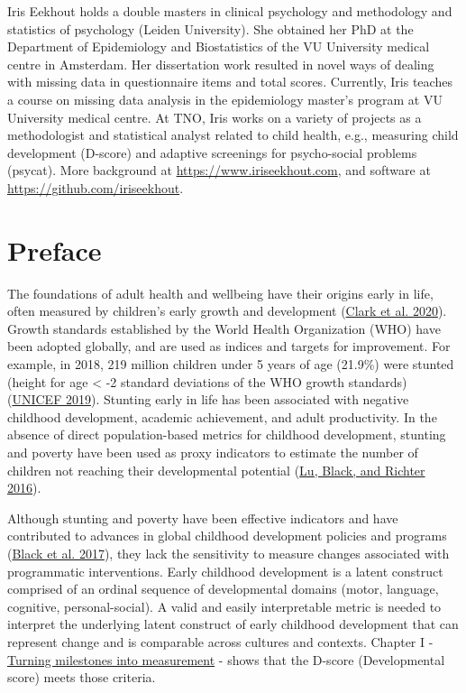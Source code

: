 \documentclass[
]{book}
\begin{document}
Iris Eekhout holds a double masters in clinical psychology and methodology and statistics of psychology (Leiden University). She obtained her PhD at the Department of Epidemiology and Biostatistics of the VU University medical centre in Amsterdam. Her dissertation work resulted in novel ways of dealing with missing data in questionnaire items and total scores. Currently, Iris teaches a course on missing data analysis in the epidemiology master's program at VU University medical centre. At TNO, Iris works on a variety of projects as a methodologist and statistical analyst related to child health, e.g., measuring child development (D-score) and adaptive screenings for psycho-social problems (psycat). More background at \url{https://www.iriseekhout.com}, and software at \url{https://github.com/iriseekhout}.

\hypertarget{preface}{%
\chapter*{Preface}\label{preface}}

The foundations of adult health and wellbeing have their origins early in life, often measured by children's early growth and development (\protect\hyperlink{ref-clark2020}{Clark et al. 2020}). Growth standards established by the World Health Organization (WHO) have been adopted globally, and are used as indices and targets for improvement. For example, in 2018, 219 million children under 5 years of age (21.9\%) were stunted (height for age \textless{} -2 standard deviations of the WHO growth standards) (\protect\hyperlink{ref-unicef2019}{UNICEF 2019}). Stunting early in life has been associated with negative childhood development, academic achievement, and adult productivity. In the absence of direct population-based metrics for childhood development, stunting and poverty have been used as proxy indicators to estimate the number of children not reaching their developmental potential (\protect\hyperlink{ref-lu2016}{Lu, Black, and Richter 2016}).

Although stunting and poverty have been effective indicators and have contributed to advances in global childhood development policies and programs (\protect\hyperlink{ref-black2017}{Black et al. 2017}), they lack the sensitivity to measure changes associated with programmatic interventions. Early childhood development is a latent construct comprised of an ordinal sequence of developmental domains (motor, language, cognitive, personal-social). A valid and easily interpretable metric is needed to interpret the underlying latent construct of early childhood development that can represent change and is comparable across cultures and contexts. Chapter I - \href{https://d-score.org/dbook1}{Turning milestones into measurement} - shows that the D-score (Developmental score) meets those criteria.
\end{document}
